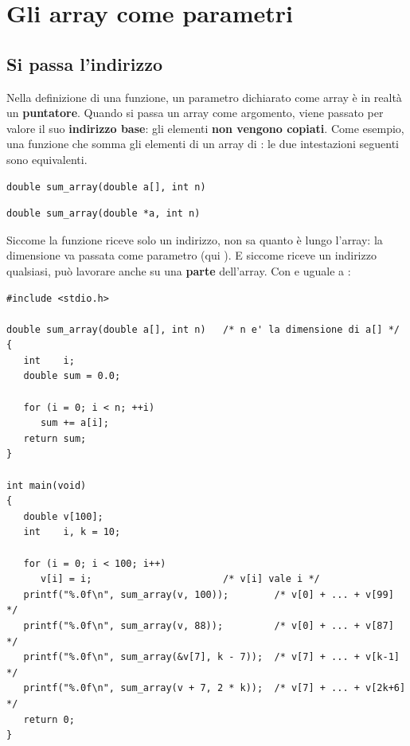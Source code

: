 \section{Gli array come parametri}

\subsection{Si passa l'indirizzo}

Nella definizione di una funzione, un parametro dichiarato come array è in
realtà un \textbf{puntatore}. Quando si passa un array come argomento, viene
passato per valore il suo \textbf{indirizzo base}: gli elementi
\textbf{non vengono copiati}. Come esempio, una funzione che somma gli
elementi di un array di : le due intestazioni seguenti sono
equivalenti.

\begin{affianco}[0.5][c]
\begin{lstlisting}[style=c]
double sum_array(double a[], int n)
\end{lstlisting}
\risultato
\begin{lstlisting}[style=c]
double sum_array(double *a, int n)
\end{lstlisting}
\end{affianco}

Siccome la funzione riceve solo un indirizzo, non sa quanto è lungo
l'array: la dimensione va passata come parametro (qui ). E siccome
riceve un indirizzo qualsiasi, può lavorare anche su una \textbf{parte}
dell'array. Con  e  uguale a :

\begin{affianco}[0.6][c]
\codicepiccolo
\begin{lstlisting}[style=c, name=sum_array.c]
#include <stdio.h>

double sum_array(double a[], int n)   /* n e' la dimensione di a[] */
{
   int    i;
   double sum = 0.0;

   for (i = 0; i < n; ++i)
      sum += a[i];
   return sum;
}

int main(void)
{
   double v[100];
   int    i, k = 10;

   for (i = 0; i < 100; i++)
      v[i] = i;                       /* v[i] vale i */
   printf("%.0f\n", sum_array(v, 100));        /* v[0] + ... + v[99]   */
   printf("%.0f\n", sum_array(v, 88));         /* v[0] + ... + v[87]   */
   printf("%.0f\n", sum_array(&v[7], k - 7));  /* v[7] + ... + v[k-1]  */
   printf("%.0f\n", sum_array(v + 7, 2 * k));  /* v[7] + ... + v[2k+6] */
   return 0;
}
\end{lstlisting}
\risultato
{}
\end{affianco}

